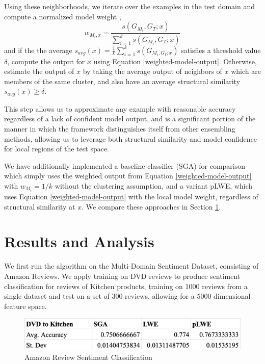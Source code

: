 \documentclass[12pt]{article}
\begin{document}
    Using these neighborhoods, we iterate over the examples in the test domain and compute a normalized model weight \autocite{gao_fan_jiang_han_2008},
    \begin{equation}
      w_{M_i,x} = \frac{s(G_{M_i}, G_T;x)}{\sum_{i=1}^{k}s(G_{M_i}, G_T;x)}
    \end{equation}
    and if the the average $s_{avg}(x) = \frac{1}{k} \sum_{i=1}^{k}s(G_{M_i,G_T;x})$ satisfies a threshold value $\delta$, compute the output for $x$ using Equation \eqref{weighted-model-output}. Otherwise, estimate the output of $x$ by taking the average output of neighbors of $x$ which are members of the same cluster, and also have an average structural similarity $s_{avg}(x) \geq \delta$.

    This step allows us to approximate any example with reasonable accuracy regardless of a lack of confident model output, and is a significant portion of the manner in which the framework distinguishes itself from other ensembling methods, allowing us to leverage both structural similarity and model confidence for local regions of the test space.

    We have additionally implemented a baseline classifier (SGA) \autocite{gao_fan_jiang_han_2008} for comparison which simply uses the weighted output from Equation \eqref{weighted-model-output} with $w_{M_i} = 1/k$ without the clustering assumption, and a variant pLWE, which uses Equation \eqref{weighted-model-output} with the local model weight, regardless of structural similarity at $x$. We compare these approaches in Section \ref{analysis}.

    \section{Results and Analysis} \label{analysis}

    We first run the algorithm on the Multi-Domain Sentiment Dataset, consisting of Amazon Reviews. We apply training on DVD reviews to produce sentiment classification for reviews of Kitchen products, training on 1000 reviews from a single dataset and test on a set of 300 reviews, allowing for a 5000 dimensional feature space.

    \begin{figure}[h]
      \centering
      \includegraphics[width=.75\textwidth]{amazon-reviews.png}
      \caption{Amazon Review Sentiment Classification}
      \label{amazon-review-fig}
    \end{figure}
\end{document}
